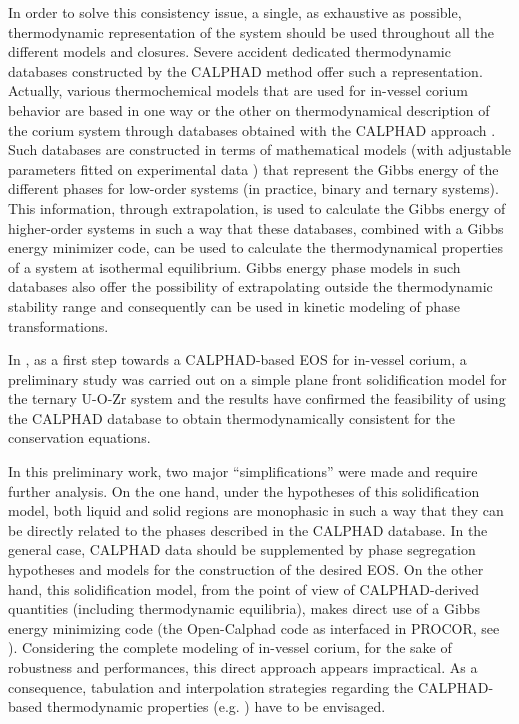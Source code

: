 \documentclass[11pt]{article}\usepackage{geometry} \geometry{letterpaper, margin=25.4mm}
\begin{document}
In order to solve this consistency issue, a single, as exhaustive as possible, thermodynamic representation of the system should be used throughout all the different models and closures. Severe accident dedicated thermodynamic databases constructed by the CALPHAD method \cite{Lukas2007} offer such a representation. Actually, various thermochemical models that are used for in-vessel corium behavior are based in one way or the other on thermodynamical description of the corium system through databases obtained with the CALPHAD approach \cite{Lukas2007}. Such databases are constructed in terms of mathematical models (with adjustable parameters fitted on experimental data \cite{Barrachin2004, Gueneau2015}) that represent the Gibbs energy of the different phases for low-order systems (in practice, binary and ternary systems). This information, through extrapolation, is used to calculate the Gibbs energy of higher-order systems in such a way that these databases, combined with a Gibbs energy minimizer code, can be used to calculate the thermodynamical properties of a system at isothermal equilibrium. Gibbs energy phase models in such databases also offer the possibility of extrapolating outside the thermodynamic stability range and consequently can be used in kinetic modeling of phase transformations.

In \cite{Tiwari2018}, as a first step towards a CALPHAD-based EOS for in-vessel corium, a preliminary study was carried out on a simple plane front solidification model for the ternary U-O-Zr system and the results have confirmed the feasibility of using the CALPHAD database to obtain thermodynamically consistent for the conservation equations. 

In this preliminary work, two major ``simplifications'' were made and require further analysis. On the one hand, under the hypotheses of this solidification model, both liquid and solid regions are monophasic in such a way that they can be directly related to the phases described in the CALPHAD database. In the general case, CALPHAD data should be supplemented by phase segregation hypotheses and models for the construction of the desired EOS. %
On the other hand, this solidification model, from the point of view of CALPHAD-derived quantities (including thermodynamic equilibria), makes direct use of a Gibbs energy minimizing code (the Open-Calphad code as interfaced in PROCOR, see \cite{Sundman2016}). Considering the complete modeling of in-vessel corium, for the sake of robustness and performances, this direct approach appears impractical. As a consequence, tabulation and interpolation strategies regarding the CALPHAD-based thermodynamic properties (e.g. \cite{Saad2015}) have to be envisaged.
\end{document}
